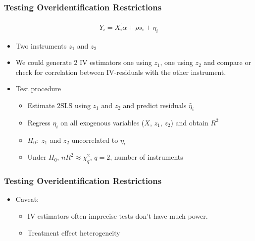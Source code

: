 \documentclass[pdftex]{beamer}
\begin{document}
\begin{frame}
\frametitle{Testing Overidentification Restrictions}

\begin{eqnarray*}
           Y_{i}= X_{i}^{'}\alpha+ \rho s_{i}+ \eta_{i}
      \end{eqnarray*}
\begin{itemize}
\item Two instruments $z_{1}$ and $z_{2}$
\item We could generate 2 IV estimators one using $z_{1}$, one using $z_{2}$ and compare or check for correlation between IV-residuals with the other instrument.
\item Test procedure

     \begin{itemize}
       \item Estimate 2SLS using $z_{1}$ and $z_{2}$ and predict residuals $\hat{\eta}_{i}$
       \item Regress $\hat{\eta}_{i}$ on all exogenous variables ($X$, $z_1$, $z_2$) and obtain $R^{2}$
       \item $H_{0}:$ $z_{1}$ and $z_{2}$ uncorrelated to $\eta_i$
       \item Under $H_0$,  $nR^{2}\approx\chi^{2}_{q}$, $q=2$, number of instruments
\end{itemize}
\end{itemize}

\end{frame}



\begin{frame}
\frametitle{Testing Overidentification Restrictions}
\begin{itemize}
\item Caveat:
      \begin{itemize}
      \item IV estimators often imprecise tests don't have much power.
      \item Treatment effect heterogeneity
      \end{itemize}


\end{itemize}
\end{frame}
\end{document}
